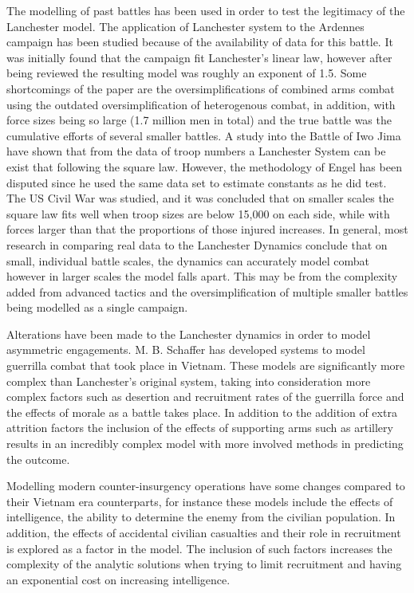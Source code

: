 The modelling of past battles has been used in order to test the legitimacy of the Lanchester model. The application of Lanchester system to the Ardennes campaign has been studied because of the availability of data for this battle. It was initially found that the campaign fit Lanchester’s linear law, however after being reviewed the resulting model was roughly an exponent of 1.5.  Some shortcomings of the paper are the oversimplifications of combined arms combat using the outdated oversimplification of heterogenous combat, in addition, with force sizes being so large (1.7 million men in total) and the true battle was the cumulative efforts of several smaller battles. 
A study into the Battle of Iwo Jima have shown that from the data of troop numbers a Lanchester System can be exist that following the square law. \cite{Willard1962} However, the methodology of Engel has been disputed since he used the same data set to estimate constants as he did test. \cite{Willard1962} The US Civil War was studied, and it was concluded that on smaller scales the square law fits well when troop sizes are below 15,000 on each side, while with forces larger than that the proportions of those injured increases. In general, most research in comparing real data to the Lanchester Dynamics conclude that on small, individual battle scales, the dynamics can accurately model combat however in larger scales the model falls apart. \cite{Weiss} This may be from the complexity added from advanced tactics and the oversimplification of multiple smaller battles being modelled as a single campaign.

Alterations have been made to the Lanchester dynamics in order to model asymmetric engagements. M. B. Schaffer has developed systems to model guerrilla combat that took place in Vietnam. These models are significantly more complex than Lanchester’s original system, taking into consideration more complex factors such as desertion and recruitment rates of the guerrilla force and the effects of morale as a battle takes place.\cite{Schaffer1967} In addition to the addition of extra attrition factors the inclusion of the effects of supporting arms such as artillery results in an incredibly complex model with more involved methods in predicting the outcome. 

Modelling modern counter-insurgency operations have some changes compared to their Vietnam era counterparts, for instance these models include the effects of intelligence, the ability to determine the enemy from the civilian population. In addition, the effects of accidental civilian casualties and their role in recruitment is explored as a factor in the model. The inclusion of such factors increases the complexity of the analytic solutions when trying to limit recruitment and having an exponential cost on increasing intelligence.

